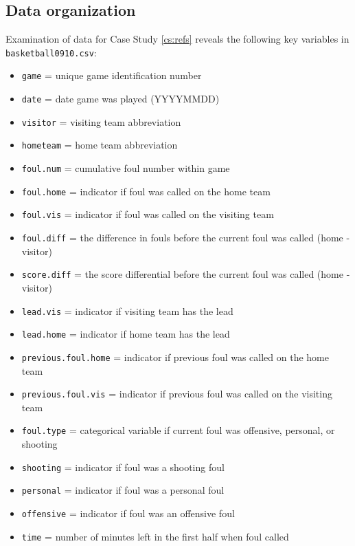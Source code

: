 \documentclass[
]{krantz}
\providecommand{\tightlist}{%
  \setlength{\itemsep}{0pt}\setlength{\parskip}{0pt}}
\begin{document}
\hypertarget{data-organization-5}{%
\subsection{Data organization}\label{data-organization-5}}

Examination of data for Case Study \ref{cs:refs} reveals the following key variables in \texttt{basketball0910.csv}:

\begin{itemize}
\tightlist
\item
  \texttt{game} = unique game identification number
\item
  \texttt{date} = date game was played (YYYYMMDD)
\item
  \texttt{visitor} = visiting team abbreviation
\item
  \texttt{hometeam} = home team abbreviation
\item
  \texttt{foul.num} = cumulative foul number within game
\item
  \texttt{foul.home} = indicator if foul was called on the home team
\item
  \texttt{foul.vis} = indicator if foul was called on the visiting team
\item
  \texttt{foul.diff} = the difference in fouls before the current foul was called (home - visitor)
\item
  \texttt{score.diff} = the score differential before the current foul was called (home - visitor)
\item
  \texttt{lead.vis} = indicator if visiting team has the lead
\item
  \texttt{lead.home} = indicator if home team has the lead
\item
  \texttt{previous.foul.home} = indicator if previous foul was called on the home team
\item
  \texttt{previous.foul.vis} = indicator if previous foul was called on the visiting team
\item
  \texttt{foul.type} = categorical variable if current foul was offensive, personal, or shooting
\item
  \texttt{shooting} = indicator if foul was a shooting foul
\item
  \texttt{personal} = indicator if foul was a personal foul
\item
  \texttt{offensive} = indicator if foul was an offensive foul
\item
  \texttt{time} = number of minutes left in the first half when foul called
\end{itemize}
\end{document}

